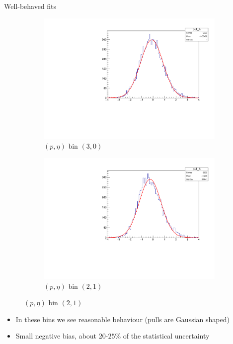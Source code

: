 \documentclass[xcolor={dvipsnames}]{beamer}
\begin{document}
\begin{frame}{Well-behaved fits}
  \vspace{0.0cm}
  \begin{figure}[htb]
    \centering
    \begin{subfigure}{0.45\textwidth}
      \centering
      \includegraphics[width=1.0\textwidth]{Plots/signal_efficiency_pull_MuonUT_P3_ETA0.pdf}
      \caption*{$(p, \eta)$ bin $(3, 0)$}
    \end{subfigure}%
    \begin{subfigure}{0.45\textwidth}
      \centering
      \includegraphics[width=1.0\textwidth]{Plots/signal_efficiency_pull_MuonUT_P2_ETA1.pdf}
      \caption*{$(p, \eta)$ bin $(2, 1)$}
    \end{subfigure}
    \vspace{-0.2cm}
  \end{figure}
  \begin{itemize}
    \item{In these bins we see reasonable behaviour (pulls are Gaussian shaped)}
    \item{Small negative bias, about $20$-$25\%$ of the statistical uncertainty}
  \end{itemize}
\end{frame}
\end{document}

